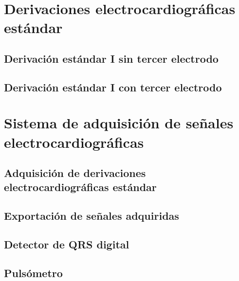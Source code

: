 \documentclass[conference]{IEEEtran}
\begin{document}
\section{Derivaciones electrocardiográficas estándar}
\subsection{Derivación estándar I sin tercer electrodo}

\subsection{Derivación estándar I con tercer electrodo}

\section{Sistema de adquisición de señales electrocardiográficas}
\subsection{Adquisición de derivaciones electrocardiográficas estándar}

\subsection{Exportación de señales adquiridas}

\subsection{Detector de QRS digital}

\subsection{Pulsómetro}
\end{document}

